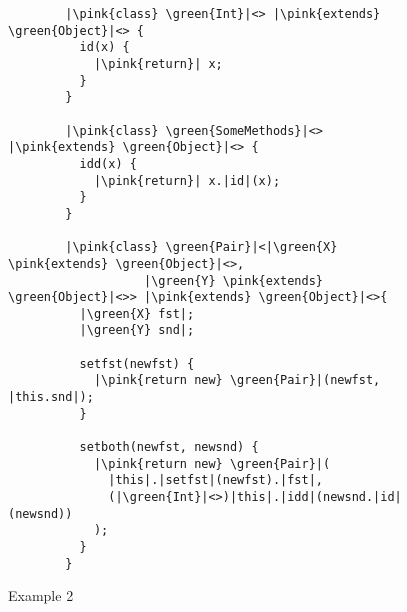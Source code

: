\begin{figure}[tp]
    \begin{verbatim}
        |\pink{class} \green{Int}|<> |\pink{extends} \green{Object}|<> {
          id(x) {
            |\pink{return}| x;
          }
        }

        |\pink{class} \green{SomeMethods}|<> |\pink{extends} \green{Object}|<> {
          idd(x) {
            |\pink{return}| x.|id|(x);
          }
        }

        |\pink{class} \green{Pair}|<|\green{X} \pink{extends} \green{Object}|<>,
                   |\green{Y} \pink{extends} \green{Object}|<>> |\pink{extends} \green{Object}|<>{
          |\green{X} fst|;
          |\green{Y} snd|;

          setfst(newfst) {
            |\pink{return new} \green{Pair}|(newfst, |this.snd|);
          }

          setboth(newfst, newsnd) {
            |\pink{return new} \green{Pair}|(
              |this|.|setfst|(newfst).|fst|,
              (|\green{Int}|<>)|this|.|idd|(newsnd.|id|(newsnd))
            );
          }
        }
    \end{verbatim}
    \caption{Example 2}
    \label{example2}
\end{figure}

